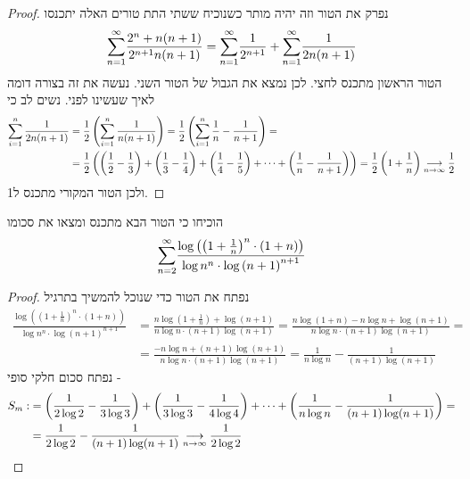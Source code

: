 \documentclass{article}
\begin{document}
\begin{proof}
נפרק את הטור וזה יהיה מותר כשנוכיח ששתי התת טורים האלה יתכנסו
\[\overset{\infty}{\underset{n=1}{\sum}}\frac{2^n + n(n+1)}{2^{n+1}n(n+1)} = \overset{\infty}{\underset{n=1}{\sum}}\frac{1}{2^{n+1}} + \overset{\infty}{\underset{n=1}{\sum}}\frac{1}{2n(n+1)}\]
הטור הראשון מתכנס לחצי. לכן נמצא את הגבול של הטור השני. נעשה את זה בצורה דומה לאיך שעשינו לפני. נשים לב כי 
\begin{align*}
\sum_{i=1}^n \frac{1}{2n(n+1)} &=\frac{1}{2}\left(\sum_{i=1}^n \frac{1}{n(n+1)}\right) =  \frac{1}{2}\left(\sum_{i=1}^n \frac{1}{n} - \frac{1}{n+1}\right) = \\ &=  \frac{1}{2}\left(\left(\frac{1}{2}-\frac{1}{3}\right) + \left(\frac{1}{3}-\frac{1}{4}\right) +\left(\frac{1}{4}-\frac{1}{5}\right) + \dots + \left(\frac{1}{n}-\frac{1}{n+1}\right)\right) = \frac{1}{2}\left(1 + \frac{1}{n}\right) \underset{n\rightarrow\infty}{\longrightarrow}\frac{1}{2}
\end{align*}
ולכן הטור המקורי מתכנס ל1.
\end{proof}

\begin{exercise}
הוכיחו כי הטור הבא מתכנס ומצאו את סכומו 
\[\overset{\infty}{\underset{n=2}{\sum}} \frac{\log \left(\left(1+\frac{1}{n}\right)^n\cdot(1+n)\right)}{\log n^n\cdot \log\left(n+1\right)^{n+1}}\]
\end{exercise}

\begin{proof}
נפתח את הטור כדי שנוכל להמשיך בתרגיל 
\begin{align*}
\frac{\log \left(\left(1+\frac{1}{n}\right)^n\cdot(1+n)\right)}{\log n^n\cdot \log\left(n+1\right)^{n+1}} &= \frac{n\log\left(1+\frac{1}{n}\right)+\log(n+1)}{n\log n\cdot (n+1)\log\left(n+1\right)} = \frac{n\log\left(1+n\right) -n\log n+\log(n+1)}{n\log n\cdot (n+1)\log\left(n+1\right)} = \\ &= \frac{-n\log n+(n+1)\log(n+1)}{n\log n\cdot (n+1)\log\left(n+1\right)} = \frac{1}{n\log n} - \frac{1}{(n+1)\log (n+1)}
\end{align*}
נפתח סכום חלקי סופי - 
\begin{align*}
S_m:&=\left(\frac{1}{2\log 2} - \frac{1}{3\log 3}\right) + \left(\frac{1}{3\log 3} - \frac{1}{4\log 4}\right) + \dots + \left(\frac{1}{n\log n} - \frac{1}{(n+1)\log (n+1)}\right) =\\ &=\frac{1}{2\log 2} - \frac{1}{(n+1)\log (n+1)} \underset{n\rightarrow\infty}{\longrightarrow} \frac{1}{2\log 2}
\end{align*}

\end{proof}
\end{document}

